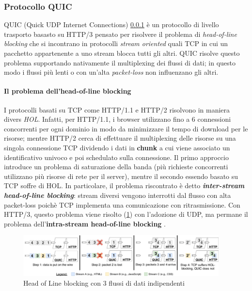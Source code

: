 \documentclass{article}
\begin{document}
\subsubsection{Protocollo QUIC} \label{section:quic-protocol}
QUIC (Quick UDP Internet Connections) \cref{section:quic-protocol}
è un protocollo di livello trasporto basasto su HTTP/3 pensato per risolvere il problema di
\textit{head-of-line blocking} che si incontrano in protocolli \textit{stream oriented}
quali TCP in cui un pacchetto appartenente a uno stream blocca tutti gli altri. QUIC risolve
questo problema supportando nativamente il multiplexing dei flussi di dati; in questo modo i
flussi più lenti o con un'alta \textit{packet-loss} non influenzano gli altri.

\paragraph{Il problema dell'head-of-line blocking} I protocolli basati su TCP come HTTP/1.1 e 
HTTP/2 risolvono in maniera divers \textit{HOL}. Infatti, per HTTP/1.1, i browser utilizzano 
fino a $6$ connessioni concorrenti per ogni dominio in modo da minimizzare il tempo di 
download per le risorse; mentre HTTP/2 cerca di effettuare il multiplexing delle risorse 
su una singola connessione TCP dividendo i dati in \textbf{chunk} a cui viene associato 
un identificativo univoco e poi schedulato sulla connessione. Il primo approccio introduce 
un problema di saturazione della banda (più richieste concorrenti utilizzano più risorse di 
rete per il server), mentre il secondo essendo basato su TCP soffre di HOL. 
In particolare, il problema riscontrato è detto \textbf{\textit{inter-stream head-of-line blocking}}: 
stream diversi vengono interrotti dal flusso con alta packet-loss poichè TCP implementa una 
comunicazione con ritrasmissione. Con HTTP/3, questo problema viene risolto (\cref{fig:hol}) con l'adozione 
di UDP, ma permane il problema dell'\textbf{intra-stream head-of-line blocking}
\cite{marx2020resource}.

\begin{figure}
  \begin{center}
    \includegraphics[width=0.95\textwidth]{figures/intra-hol-vs-inter-hol.png}
  \end{center}
  \caption{Head of Line blocking con 3 flussi di dati indipendenti \cite{marx2020resource}}\label{fig:hol}
\end{figure}
\end{document}

